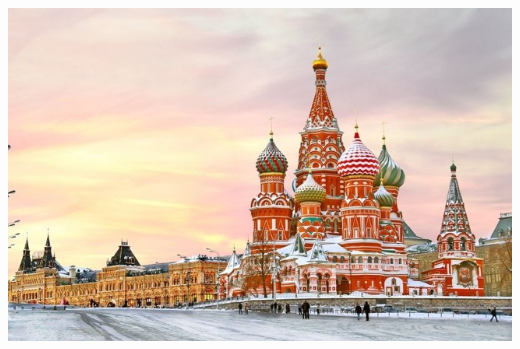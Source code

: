 \documentclass[default]{beamer}
\begin{document}
\begin{frame}
\begin{columns}
\begin{column}{0.5\textwidth}
				\includegraphics[width=\textwidth]{misc/origin_moscow.jpg}
			\end{column}
		\end{columns}

	\end{frame}
	
\end{document}
